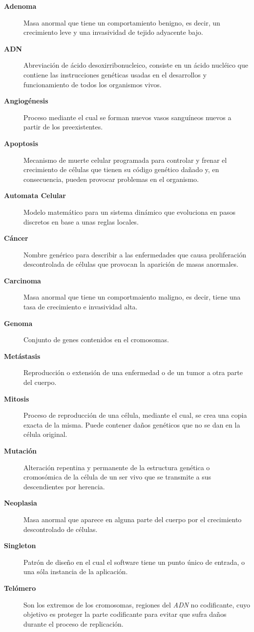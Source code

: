 \begin{description}
    \item[\textbf{Adenoma}] Masa anormal que tiene un comportamiento benigno, es decir, un crecimiento leve y una invasividad de tejido adyacente bajo.
    \item[\textbf{ADN}] Abreviación de ácido desoxirribonucleico, consiste en un ácido nucléico que contiene las instrucciones genéticas usadas en el desarrollos y funcionamiento de todos los organismos vivos.
    \item[\textbf{Angiogénesis}] Proceso mediante el cual se forman nuevos vasos sanguíneos nuevos a partir de los preexistentes.
    \item[\textbf{Apoptosis}] Mecanismo de muerte celular programada para controlar y frenar el crecimiento de células que tienen su código genético dañado y, en consecuencia, pueden provocar problemas en el organismo.
    \item[\textbf{Automata Celular}] Modelo matemático para un sistema dinámico que evoluciona en pasos discretos en base a unas reglas locales.
    \item[\textbf{Cáncer}] Nombre genérico para describir a las enfermedades que causa proliferación descontrolada de células que provocan la aparición de masas anormales.
    \item[\textbf{Carcinoma}] Masa anormal que tiene un comportmaiento maligno, es decir, tiene una tasa de crecimiento e invasividad alta.
    \item[\textbf{Genoma}] Conjunto de genes contenidos en el cromosomas.
    \item[\textbf{Metástasis}] Reproducción o extensión de una enfermedad o de un tumor a otra parte del cuerpo.
    \item[\textbf{Mitosis}] Proceso de reproducción de una célula, mediante el cual, se crea una copia exacta de la misma. Puede contener daños genéticos que no se dan en la célula original.
    \item[\textbf{Mutación}] Alteración repentina y permanente de la estructura genética o cromosómica de la célula de un ser vivo que se transmite a sus descendientes por herencia.
    \item[\textbf{Neoplasia}] Masa anormal que aparece en alguna parte del cuerpo por el crecimiento descontrolado de células.
    \item[\textbf{Singleton}] Patrón de diseño en el cual el software tiene un punto único de entrada, o una sóla instancia de la aplicación.
    \item[\textbf{Telómero}] Son los extremos de los cromosomas, regiones del \textit{ADN} no codificante, cuyo objetivo es proteger la parte codificante para evitar que sufra daños durante el proceso de replicación.
\end{description}
